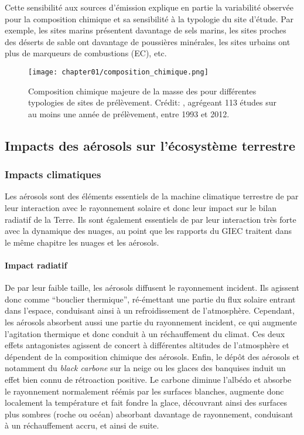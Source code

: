 Cette sensibilité aux sources d'émission explique en partie la variabilité observée pour la
composition chimique et sa sensibilité à la typologie du site d'étude. Par exemple, les
sites marins présentent davantage de sels marins, les sites proches des déserts de sable
ont davantage de poussières minérales, les sites urbains ont plus de marqueurs de
combustions (EC), etc.

\begin{figure}[ht]
    \centering
    \texttt{[image: chapter01/composition\_chimique.png]}
    \caption{Composition chimique majeure de la masse des \PMdix{} pour différentes
        typologies de sites de prélèvement. Crédit: \cite[figure 7.13]{boucherClouds2013},
        agrégeant 113 études sur au moins une année de prélèvement, entre 1993 et 2012.}%
    \label{fig:chapter01/composition_chimique}
\end{figure}

\subsection{Impacts des aérosols sur l'écosystème terrestre}%
\label{sub:impacts_des_aérosols_sur_l_écosystème_terrestre}

\subsubsection{Impacts climatiques}%
\label{ssub:impacts_climatiques}

Les aérosols sont des éléments essentiels de la machine climatique terrestre de par leur
interaction avec le rayonnement solaire et donc leur impact sur le bilan radiatif de la
Terre. Ils sont également essentiels de par leur interaction très forte avec la dynamique
des nuages, au point que les rapports du GIEC traitent dans le même chapitre les nuages et
les aérosols.

\paragraph{Impact radiatif}%
\label{par:impact_radiatif}

De par leur faible taille, les aérosols diffusent le rayonnement incident. Ils agissent
donc comme ``bouclier thermique'', ré-émettant une partie du flux solaire entrant dans
l'espace, conduisant ainsi à un refroidissement de l'atmosphère.  Cependant, les aérosols
absorbent aussi une partie du rayonnement incident, ce qui augmente l'agitation thermique
et donc conduit à un réchauffement du climat.  Ces deux effets antagonistes agissent de
concert à différentes altitudes de l'atmosphère et dépendent de la composition chimique
des aérosols.  Enfin, le dépôt des aérosols et notamment du \textit{black carbone} sur la
neige ou les glaces des banquises induit un effet bien connu de rétroaction positive. Le
carbone diminue l'albédo et absorbe le rayonnement normalement réémis par les surfaces
blanches, augmente donc localement la température et fait fondre la glace, découvrant
ainsi des surfaces plus sombres (roche ou océan) absorbant davantage de rayonnement,
conduisant à un réchauffement accru, et ainsi de suite.

